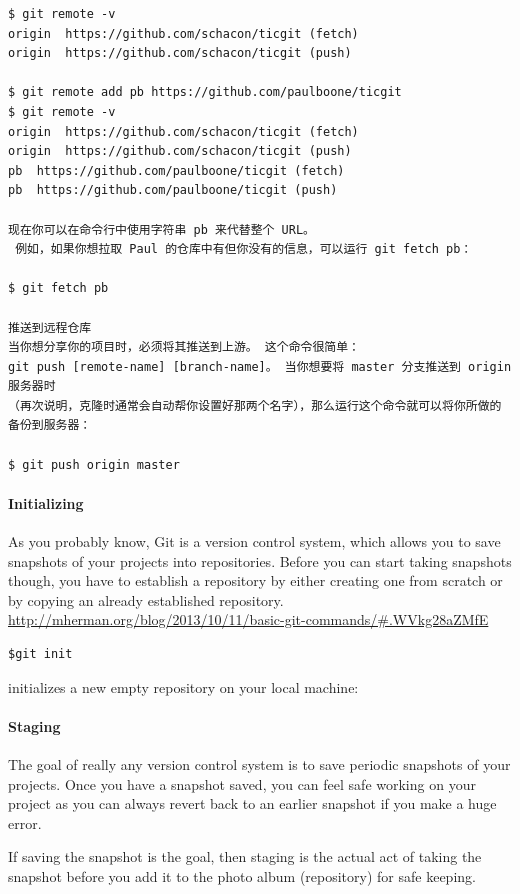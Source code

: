 \begin{verbatim}
$ git remote -v
origin	https://github.com/schacon/ticgit (fetch)
origin	https://github.com/schacon/ticgit (push)

$ git remote add pb https://github.com/paulboone/ticgit
$ git remote -v
origin	https://github.com/schacon/ticgit (fetch)
origin	https://github.com/schacon/ticgit (push)
pb	https://github.com/paulboone/ticgit (fetch)
pb	https://github.com/paulboone/ticgit (push)

现在你可以在命令行中使用字符串 pb 来代替整个 URL。
 例如，如果你想拉取 Paul 的仓库中有但你没有的信息，可以运行 git fetch pb：

$ git fetch pb

推送到远程仓库
当你想分享你的项目时，必须将其推送到上游。 这个命令很简单：
git push [remote-name] [branch-name]。 当你想要将 master 分支推送到 origin 服务器时
（再次说明，克隆时通常会自动帮你设置好那两个名字），那么运行这个命令就可以将你所做的备份到服务器：

$ git push origin master

\end{verbatim}


\paragraph*{Initializing}

As you probably know, Git is a version control system, which allows you to save snapshots of your projects into repositories. Before you can start taking snapshots though, you have to establish a repository by either creating one from scratch or by copying an already established repository. \url{http://mherman.org/blog/2013/10/11/basic-git-commands/#.WVkg28aZMfE}

\begin{verbatim}
$git init 
\end{verbatim}

initializes a new empty repository on your local machine:

\paragraph*{Staging}

The goal of really any version control system is to save periodic snapshots of your projects. Once you have a snapshot saved, you can feel safe working on your project as you can always revert back to an earlier snapshot if you make a huge error.

If saving the snapshot is the goal, then staging is the actual act of taking the snapshot before you add it to the photo album (repository) for safe keeping.

